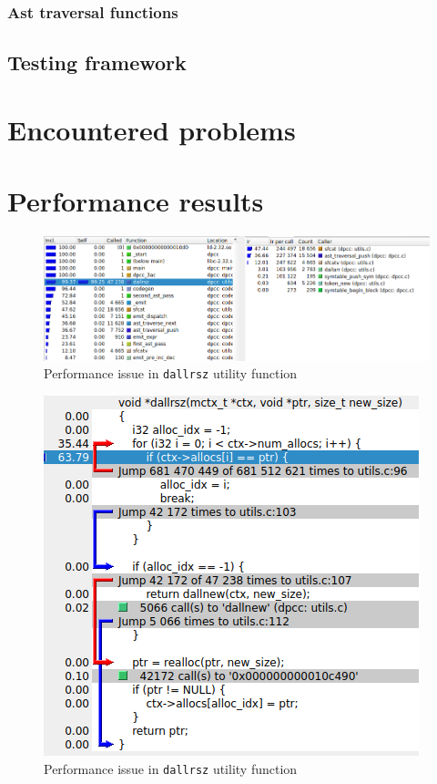 \documentclass[a4paper]{article}
\begin{document}
\subsubsection{Ast traversal functions}

\subsection{Testing framework}


\section{Encountered problems}


\section{Performance results}

\begin{figure}[H]
    \centering
    \includegraphics[width=\linewidth]{imgs/dallrsz_performance_issue.png}
    \caption{Performance issue in \texttt{dallrsz} utility function}
\end{figure}


\begin{figure}[H]
    \centering
    \includegraphics{imgs/dallrsz_code_usage.png}
    \caption{Performance issue in \texttt{dallrsz} utility function}
\end{figure}
\end{document}
